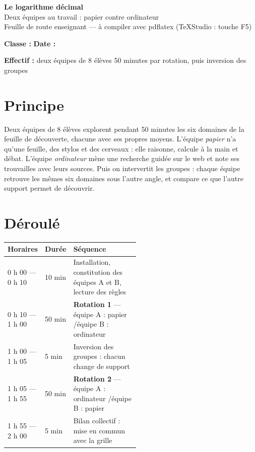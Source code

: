 \documentclass[11pt,a4paper]{article}
\newcommand{\champ}[1]{\makebox[#1]{\dotfill}}
\begin{document}
\begin{center}{\LARGE\bfseries Le logarithme décimal}\\[4pt]{\large Deux équipes au travail : papier contre ordinateur}\\[8pt]{\small Feuille de route enseignant --- à compiler avec pdflatex (TeXStudio : touche F5)}\end{center}

{\bfseries Classe :} \champ{4.6cm}\hfill {\bfseries Date :} \champ{3.6cm}\par\smallskip
{\bfseries Effectif :} deux équipes de 8 élèves\quad{} 50 minutes par rotation, puis inversion des groupes
\section*{Principe}
Deux équipes de 8 élèves explorent pendant 50 minutes les six domaines de la feuille de découverte, chacune avec ses propres moyens. L'équipe \emph{papier} n'a qu'une feuille, des stylos et des cerveaux : elle raisonne, calcule à la main et débat. L'équipe \emph{ordinateur} mène une recherche guidée sur le web et note ses trouvailles avec leurs sources. Puis on intervertit les groupes : chaque équipe retrouve les mêmes six domaines sous l'autre angle, et compare ce que l'autre support permet de découvrir.
\section*{Déroulé}
\begin{tabular}{@{}llp{0.52\linewidth}@{}}
\toprule
Horaires & Durée & Séquence \\
\midrule
0 h 00 --- 0 h 10 & 10 min & Installation, constitution des équipes A et B, lecture des règles \\
0 h 10 --- 1 h 00 & 50 min & \textbf{Rotation 1} --- équipe A : papier \quad/\quad équipe B : ordinateur \\
1 h 00 --- 1 h 05 & 5 min & Inversion des groupes : chacun change de support \\
1 h 05 --- 1 h 55 & 50 min & \textbf{Rotation 2} --- équipe A : ordinateur \quad/\quad équipe B : papier \\
1 h 55 --- 2 h 00 & 5 min & Bilan collectif : mise en commun avec la grille \\
\bottomrule
\end{tabular}
\end{document}
